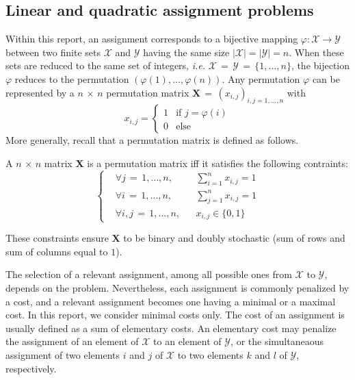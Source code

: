 \subsection{Linear and quadratic assignment problems}\label{sec:mainDefAssignment}
Within this report, an assignment corresponds to a bijective mapping $\varphi:\mathcal{X}{\rightarrow}\mathcal{Y}$ between two finite sets
$\mathcal{X}$ and $\mathcal{Y}$ having the same size $|\mathcal{X}| = |\mathcal{Y}| = n$.
When these sets are reduced to the same set of integers, \textit{i.e.} $\mathcal{X}\,{=}\,\mathcal{Y}\,{=}\,\{1,\ldots,n\}$, the bijection $\varphi$ reduces to the permutation $(\varphi(1),\ldots,\varphi(n))$. Any permutation $\varphi$ can be represented by a $n\,{\times}\,n$ permutation matrix $\mathbf{X}\,{=}\,(x_{i,j})_{i,j=1,\ldots,n}$ with 
\begin{equation}
x_{i,j} = 
\begin{cases}
1 & \text{if } j =  \varphi(i) \\
0 & \text{else}
\end{cases}
\end{equation}
More generally, recall that a permutation matrix is defined as follows.
\begin{definition}\label{def:permutationmatrix}
A $n\,{\times}\,n$ matrix $\mathbf{X}$ is a permutation matrix iff it satisfies the following contraints:
\begin{equation}\label{eq-cts-mtx-perm}
  \left\lbrace\begin{aligned}
  &\forall j\,{=}\,1,\ldots,n,&&\sum_{i=1}^n x_{i,j} = 1 \\
  &\forall i\,{=}\,1,\ldots,n,&&\sum_{j=1}^n x_{i,j} = 1 \\
  &\forall i,j\,{=}\,1,\ldots,n,&&x_{i,j} \in \{0,1\}
  \end{aligned}\right.
  \end{equation}
\end{definition}
These constraints ensure $\mathbf{X}$ to be binary and doubly stochastic (sum of rows and sum of columns equal to $1$).

The selection of a relevant assignment, among all possible ones from $\mathcal{X}$ to $\mathcal{Y}$, depends on the problem. Nevertheless, each assignment is commonly penalized by a cost, and a relevant assignment becomes one having a minimal or a maximal cost. In this report, we consider minimal costs only. The cost of an assignment is usually defined as a sum of elementary costs. An elementary cost may penalize the assignment of an element of $\mathcal{X}$ to an element of $\mathcal{Y}$, or the simultaneaous assignment of two elements $i$ and $j$ of $\mathcal{X}$ to two elements $k$ and $l$ of $\mathcal{Y}$, respectively.

